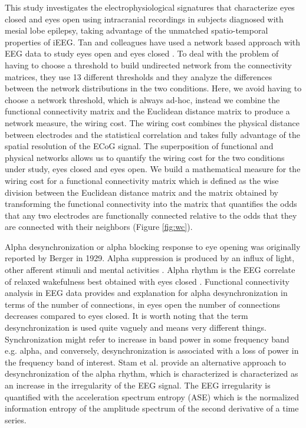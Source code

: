\documentclass[11pt, onecolumn]{article}
\begin{document}
This study investigates the electrophysiological signatures that characterize eyes closed and eyes open using intracranial recordings in subjects diagnosed with mesial lobe epilepsy, taking advantage of the unmatched spatio-temporal properties of iEEG. %
Tan and colleagues have used a network based approach with EEG data to study eyes open and eyes closed \citep{tan2013difference}. To deal with the problem of having to choose a threshold to build undirected network from the connectivity matrices, they use 13 different thresholds and they analyze the differences between the network distributions in the two conditions. 
Here, we avoid having to choose a network threshold, which is always ad-hoc, instead we combine the functional connectivity matrix and the Euclidean distance matrix to produce a network measure, the wiring cost. The wiring cost combines the physical distance between electrodes and the statistical correlation and takes fully advantage of the spatial resolution of the ECoG signal. The superposition of functional and physical networks allows us to quantify the wiring cost for the two conditions under study, eyes closed and eyes open. %
We build a mathematical measure for the wiring cost for a functional connectivity matrix which is defined as the wise division between the Euclidean distance matrix and the matrix obtained by transforming the functional connectivity into the matrix that quantifies the odds that any two electrodes are functionally connected relative to the odds that they are connected with their neighbors (Figure \ref{fig:wc}).

Alpha desynchronization or alpha blocking response to eye opening was originally reported by Berger in 1929. Alpha suppression is produced by an influx of light, other afferent stimuli and mental activities \citep{schomer2012niedermeyer}. Alpha rhythm is the EEG correlate of relaxed wakefulness best obtained with eyes closed \citep{niedermeyer2005electroencephalography}. Functional connectivity analysis in EEG data provides and explanation for alpha desynchronization in terms of the number of connections, in eyes open the number of connections decreases compared to eyes closed. It is worth noting that the term desynchronization is used quite vaguely and means very different things. Synchronization might refer to increase in band power in some frequency band e.g. alpha, and conversely, desynchronization is associated with a loss of power in the frequency band of interest. Stam et al.\citep{stam1993quantification} provide an alternative approach to desynchronization of the alpha rhythm, which is characterized is characterized as an increase in the irregularity of the EEG signal. The EEG irregularity is quantified with the acceleration spectrum entropy (ASE) which is the normalized information entropy of the amplitude spectrum of the second derivative of a time series. 
\end{document}
